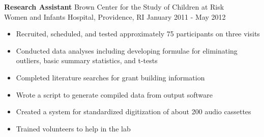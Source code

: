 \documentclass[line,margin,10pt]{res}
\begin{document}
\begin{resume}
\textbf{Research Assistant} \hfill Brown Center for the Study  of Children at Risk\\
Women and Infants Hospital, Providence, RI \hfill January 2011 - May 2012 \
\begin{itemize} \itemsep -2pt
	\item Recruited, scheduled, and tested approximately 75 participants on three visits
	\item Conducted data analyses including developing formulae for eliminating outliers, basic summary statistics, and t-tests
	\item Completed literature searches for grant building information
	\item Wrote a script to generate compiled data from output software
	\item Created a system for standardized digitization of about 200 audio cassettes 
	\item Trained volunteers to help in the lab
	\end{itemize}
	

\end{resume}
\end{document}
